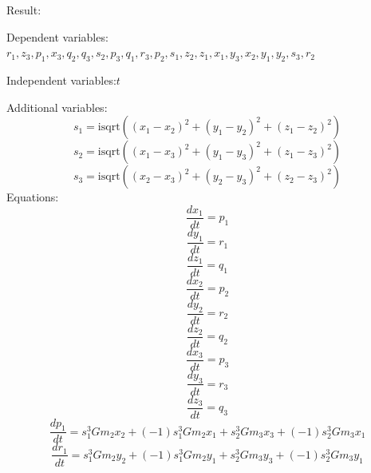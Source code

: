\documentclass[10pt,a4paper]{article}
\begin{document}
Result:

Dependent variables:$r_{1}, z_{3}, p_{1}, x_{3}, q_{2}, q_{3}, s_{2}, p_{3}, q_{1}, r_{3}, p_{2}, s_{1}, z_{2}, z_{1}, x_{1}, y_{3}, x_{2}, y_{1}, y_{2}, s_{3}, r_{2}$

Independent variables:$t$

Additional variables:
\begin{dmath*}s_{1} = \text{isqrt}\left(\left(x_{1} - x_{2}\right) ^ {2} + \left(y_{1} - y_{2}\right) ^ {2} + \left(z_{1} - z_{2}\right) ^ {2}\right)\end{dmath*}
\begin{dmath*}s_{2} = \text{isqrt}\left(\left(x_{1} - x_{3}\right) ^ {2} + \left(y_{1} - y_{3}\right) ^ {2} + \left(z_{1} - z_{3}\right) ^ {2}\right)\end{dmath*}
\begin{dmath*}s_{3} = \text{isqrt}\left(\left(x_{2} - x_{3}\right) ^ {2} + \left(y_{2} - y_{3}\right) ^ {2} + \left(z_{2} - z_{3}\right) ^ {2}\right)\end{dmath*}
Equations:
\begin{dmath*}\frac{dx_{1}}{dt} = p_{1}\end{dmath*}
\begin{dmath*}\frac{dy_{1}}{dt} = r_{1}\end{dmath*}
\begin{dmath*}\frac{dz_{1}}{dt} = q_{1}\end{dmath*}
\begin{dmath*}\frac{dx_{2}}{dt} = p_{2}\end{dmath*}
\begin{dmath*}\frac{dy_{2}}{dt} = r_{2}\end{dmath*}
\begin{dmath*}\frac{dz_{2}}{dt} = q_{2}\end{dmath*}
\begin{dmath*}\frac{dx_{3}}{dt} = p_{3}\end{dmath*}
\begin{dmath*}\frac{dy_{3}}{dt} = r_{3}\end{dmath*}
\begin{dmath*}\frac{dz_{3}}{dt} = q_{3}\end{dmath*}
\begin{dmath*}\frac{dp_{1}}{dt} = s_{1} ^ {3}  G  m_{2}  x_{2} + \left(-1\right)  s_{1} ^ {3}  G  m_{2}  x_{1} + s_{2} ^ {3}  G  m_{3}  x_{3} + \left(-1\right)  s_{2} ^ {3}  G  m_{3}  x_{1}\end{dmath*}
\begin{dmath*}\frac{dr_{1}}{dt} = s_{1} ^ {3}  G  m_{2}  y_{2} + \left(-1\right)  s_{1} ^ {3}  G  m_{2}  y_{1} + s_{2} ^ {3}  G  m_{3}  y_{3} + \left(-1\right)  s_{2} ^ {3}  G  m_{3}  y_{1}\end{dmath*}
\end{document}
